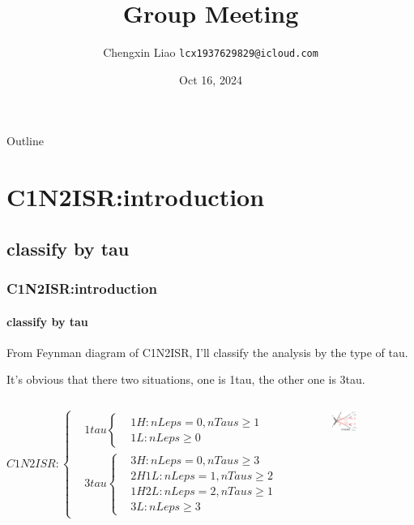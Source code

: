 \documentclass[usenames,dvipsnames]{beamer}
\title[IHEP SUSY Group Meeting]{Group Meeting}
\date[Oct 16, 2024]{Oct 16, 2024}
\author[Chengxin Liao]{
  Chengxin Liao
  \pdfnewline
  \texttt{lcx1937629829@icloud.com}
}
\institute{Department of Physics, Shandong University}
\begin{document}
\begin{frame}
\titlepage
\end{frame}

\begin{frame}{Outline}
\tableofcontents
\end{frame}

\section{C1N2ISR:introduction}
\subsection{classify by tau}
\begin{frame}
\frametitle{C1N2ISR:introduction}
\framesubtitle{classify by tau}
From Feynman diagram of C1N2ISR, I'll classify the analysis by the type of tau.

\vskip 0.2cm

It's obvious that there two situations, one is 1tau, the other one is 3tau.


\begin{columns}
    \raggedright
	\begin{equation*}
	C1N2ISR:
	\left\{
	\begin{split}
		& 1tau
		\left\{
		\begin{split}
		& 1H:nLeps=0,nTaus\geq 1\\
		& 1L:nLeps\geq0
		\end{split}
		\right.
		\\
		& 3tau
		\left\{
		\begin{split}
		& 3H:nLeps=0,nTaus\geq 3\\
		& 2H1L:nLeps=1,nTaus\geq 2\\
		& 1H2L:nLeps=2,nTaus\geq 1\\
		& 3L:nLeps\geq 3
		\end{split}
		\right.
	\end{split}
	\right.
	\end{equation*}
	
    
    \raggedleft
    \begin{figure}
    \includegraphics[width = 0.5\textwidth]{graphics/Feynman diagram.png}
    \end{figure}
 \end{columns}

\end{frame}
\end{document}
